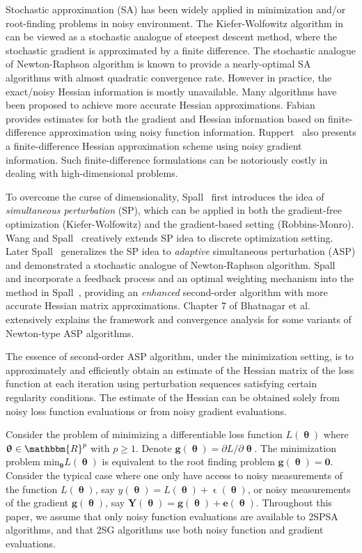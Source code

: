 \documentclass[conference,10.3cpt]{IEEEtran}
\begin{document}
Stochastic approximation (SA) has been widely applied in minimization and/or
root-finding problems in noisy environment. The Kiefer-Wolfowitz algorithm in \cite{Kiefer1952} can be viewed as a stochastic analogue of steepest descent method, where the stochastic gradient is approximated by a finite difference. The stochastic analogue of Newton-Raphson algorithm is known to provide a nearly-optimal SA algorithms with almost quadratic convergence rate. However in practice, the exact/noisy Hessian information is mostly unavailable. Many algorithms have been proposed to achieve more accurate Hessian approximations. Fabian~\cite{Fabian1971} provides estimates for both the gradient and Hessian information based on finite-difference approximation using noisy function information. Ruppert~\cite{Ruppert1985} also presents a finite-difference Hessian approximation scheme using noisy gradient information. Such finite-difference formulations can be notoriously costly in dealing with high-dimensional problems. 

To overcome the curse of dimensionality, Spall~\cite{Spall1992} first introduces the idea of \textit{simultaneous perturbation} (SP), which can be applied
in both the gradient-free optimization (Kiefer-Wolfowitz) and the
gradient-based setting (Robbins-Monro).  Wang and Spall~\cite{Wang2011} creatively extends SP idea to discrete optimization setting. Later Spall~\cite{Spall2000}
generalizes the SP idea to \textit{adaptive} simultaneous perturbation (ASP) and demonstrated a stochastic
analogue of Newton-Raphson algorithm.  Spall~\cite{Spall2007} and \cite{Spall2009} incorporate a feedback process and an optimal weighting mechanism into the method in Spall~\cite{Spall2000}, providing an
\textit{enhanced} second-order algorithm with more accurate Hessian matrix approximations. Chapter 7 of Bhatnagar et al.~\cite{Bhatnagar2012} extensively explains the framework and convergence analysis for some variants of Newton-type ASP algorithms.

The essence of second-order ASP algorithm, under the minimization setting,
is to approximately and efficiently obtain an estimate of the
Hessian matrix of the loss function at each
iteration using perturbation sequences satisfying certain regularity
conditions. The estimate of the Hessian can be obtained solely from
noisy loss function evaluations or from noisy gradient
evaluations.

Consider the problem of minimizing a
differentiable loss function $ L(\bm{\uptheta}) $ where
$ \bm{\uptheta} \in \mathbbm{R}^p $ with $ p\ge1 $. Denote
$\bm{g}(\bm{\uptheta})={\partial L}/{\partial \bm{\uptheta}}$. The
minimization problem ${\text{min}}_{\bm{\uptheta}}L(\bm{\uptheta})$ is
equivalent to the root finding problem $\bm{g}(\bm{\uptheta})=\bm{0}$.
Consider the typical case where one only have access to noisy measurements of
the function $ L(\bm{\uptheta}) $, say
$ y(\bm{\uptheta})=L(\bm{\uptheta})+\upvarepsilon(\bm{\uptheta}) $, or
noisy measurements of the gradient $\bm{g}(\bm{\uptheta})$, say
$\bm{Y}(\bm{\uptheta})=\bm{g}(\bm{\uptheta})+\bm{e}(\bm{\uptheta})$. Throughout this paper, we assume that only noisy function
evaluations are available to 2SPSA algorithms, and that 2SG algorithms use both noisy function and gradient evaluations.
\end{document}
